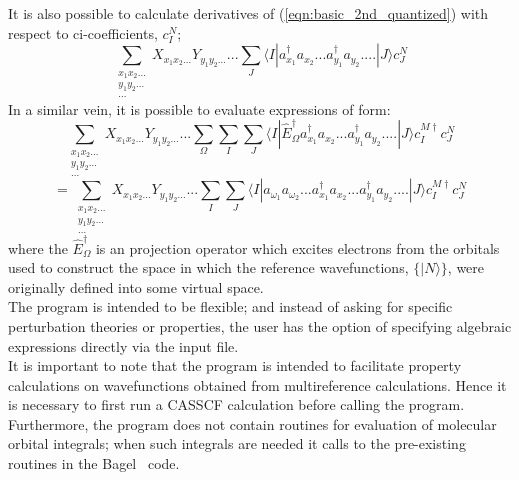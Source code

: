 \noindent It is also possible to calculate derivatives of (\ref{eqn:basic_2nd_quantized})  with respect to ci-coefficients, $c_{I}^{N}$;
\begin{equation}
\sum_{\substack{ x_{1}x_{2}...\\ y_{1}y_{2}... \\ ...}} X_{x_{1}x_{2}...} Y_{y_{1}y_{2}...} ...
\sum_{J}
\langle I | a^{\dagger}_{x_{1}} a_{x_{2}}...a^{\dagger}_{y_{1}}a_{y_{2}}....| J \rangle 
c^{N}_{J}
\label{eqn:ci_derivative}
\end{equation}
\noindent In a similar vein, it is possible to evaluate expressions of form:
\begin{equation*}
\sum_{\substack{ x_{1}x_{2}...\\ y_{1}y_{2}... \\ ...}} X_{x_{1}x_{2}...} Y_{y_{1}y_{2}...} ...
\sum_{\Omega}
\sum_{I}\sum_{J}
\langle I | \hat{E}^{\dagger}_{\Omega} a^{\dagger}_{x_{1}} a_{x_{2}}...a^{\dagger}_{y_{1}}a_{y_{2}}....| J \rangle 
 c^{M \dagger}_{I}c^{N}_{J}
\end{equation*}
\begin{equation}
=
\sum_{\substack{ x_{1}x_{2}...\\ y_{1}y_{2}... \\ ...}} X_{x_{1}x_{2}...} Y_{y_{1}y_{2}...} ...
\sum_{I}\sum_{J}
\langle I | a_{\omega_{1}} a_{\omega_{2}}.. .a^{\dagger}_{x_{1}} a_{x_{2}}...a^{\dagger}_{y_{1}}a_{y_{2}}....| J \rangle 
 c^{M \dagger}_{I}c^{N}_{J}
\label{eqn:basic_2nd_quantized_projector}
\end{equation}
\noindent where the $\hat{E}^{\dagger}_{\Omega}$ is an projection operator
which excites electrons from the orbitals used to construct the space in which
the reference wavefunctions, $\{|N\rangle\}$, were originally defined into some
virtual space.\\

\noindent The program is intended to be flexible; and instead of asking for
specific perturbation theories or properties, the user has the option of
specifying algebraic expressions directly via the input file.\\

\noindent It is important to note that the program is intended to facilitate property 
calculations on wavefunctions obtained from multireference calculations. Hence it
is necessary to first run a CASSCF calculation before calling the program. Furthermore,
the program does not contain routines for evaluation of molecular orbital integrals;
when such integrals are needed it calls to the pre-existing routines in the 
Bagel~\cite{BAGEL} code.


